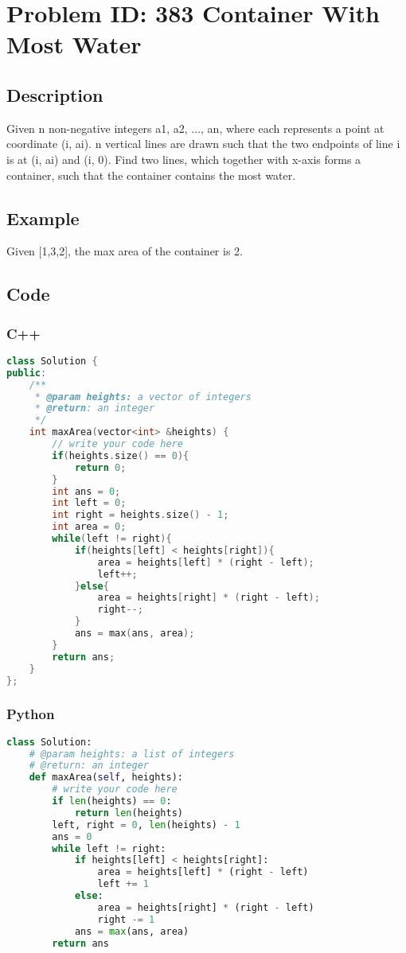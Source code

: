 \section{Problem ID: 383 Container With Most Water}
\subsection{Description}
Given n non-negative integers a1, a2, ..., an, where each represents a point at coordinate (i, ai). n vertical lines are drawn such that the two endpoints of line i is at (i, ai) and (i, 0). Find two lines, which together with x-axis forms a container, such that the container contains the most water.

\subsection{Example}
Given [1,3,2], the max area of the container is 2.

\subsection{Code}
\scriptsize
\subsubsection{C++}
\begin{lstlisting}[language=C++]
class Solution {
public:
    /**
     * @param heights: a vector of integers
     * @return: an integer
     */
    int maxArea(vector<int> &heights) {
        // write your code here
        if(heights.size() == 0){
            return 0;
        }
        int ans = 0;
        int left = 0;
        int right = heights.size() - 1;
        int area = 0;
        while(left != right){
            if(heights[left] < heights[right]){
                area = heights[left] * (right - left);
                left++;
            }else{
                area = heights[right] * (right - left);
                right--;
            }
            ans = max(ans, area);
        }
        return ans;
    }
};
\end{lstlisting}

\subsubsection{Python}
\begin{lstlisting}[language=Python]
class Solution:
    # @param heights: a list of integers
    # @return: an integer
    def maxArea(self, heights):
        # write your code here
        if len(heights) == 0:
            return len(heights)
        left, right = 0, len(heights) - 1
        ans = 0
        while left != right:
            if heights[left] < heights[right]:
                area = heights[left] * (right - left)
                left += 1
            else:
                area = heights[right] * (right - left)
                right -= 1
            ans = max(ans, area)
        return ans
\end{lstlisting}
\normalsize 
